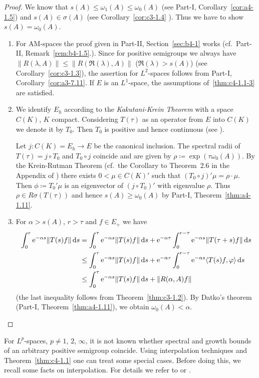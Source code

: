\begin{proof}
We know that $s(A) \leq \omega_{1}(A) \leq \omega_{0}(A)$ (see Part-I, Corollary~\ref{cor:a4-1.5}) and $s(A) \in \sigma(A)$ (see Corollary~\ref{cor:c3-1.4} ).
Thus we have to show $s(A) = \omega_{0}(A)$.
\begin{enumerate}[\upshape (i), wide, labelindent=.25em]
\item 
For AM-spaces the proof given in Part-II, Section~\ref{sec:b4-1} works (cf.\ Part-II, Remark~\ref{rem:b4-1.5}.).
Since for positive semigroups we always have $\|R(\lambda,A)\| \leq \|R(\Re(\lambda), A)\|$ ($\Re(\lambda) > s(A)$) (see   Corollary~\ref{cor:c3-1.3}), the assertion for $L^{2}$-spaces follows from Part-I, Corollary~\ref{cor:a3-7.11}.
If\/ $E$ is an $L^{1}$-space, the assumptions of~\ref{thm:c4-1.1-3} are satisfied.

\item 
We identify $E_{h}$ according to the \emph{Kakutani-Krein Theorem} with a space $C(K)$, $K$ compact.
Considering $T(\tau)$ as an operator from $E$ into $C(K)$ we denote it by $T_{0}$.
Then $T_{0}$ is positive and hence continuous (see \textcite[Theorem~5.3]{schaefer:1974}).

Let $j \colon C(K) = E_{h} \to E$ be the canonical inclusion.
The spectral radii of\/ $T(\tau) = j \circ T_{0}$ and $T_{0} \circ j$ coincide and are given by $\rho \coloneq  \exp(\tau \omega_{0}(A))$.
By the Krein-Rutman Theorem (cf.\ the Corollary to Theorem~2.6 in the Appendix of \textcite{schaefer:1966}) there exists $0 < \mu \in C(K)'$ such that $(T_{0} \circ j)'\mu = \rho \cdot \mu$.
Then $\phi \coloneq  T_{0}'\mu$ is an eigenvector of\/ $(j \circ T_{0})'$ with eigenvalue $\rho$.
Thus $\rho \in R\sigma(T(\tau))$ and hence $s(A) \geq \omega_{0}(A)$ by Part-I, Theorem~\ref{thm:a4-1.11}.

\item
For $\alpha > s(A)$, $r > \tau$ and $f \in E_{+}$ we have
\begin{align*}
\int_{0}^{r} \eu^{-\alpha s}\|T(s)f\| \ds &= \int_{0}^{\tau} \eu^{-\alpha s}\|T(s)f\| \ds + \eu^{-\alpha \tau}\int_{0}^{r-\tau} \eu^{-\alpha s}\|T(\tau+s)f\| \ds \\
&\leq \int_{0}^{\tau} \eu^{-\alpha s}\|T(s)f\| \ds + \eu^{-\alpha \tau}\int_{0}^{r-\tau} \eu^{-\alpha s}\langle T(s)f,\phi \rangle \ds \\
&\leq \int_{0}^{\tau} \eu^{-\alpha s}\|T(s)f\| \ds + \|R(\alpha,A)f\|
\end{align*}
(the last inequality follows from Theorem~\ref{thm:c3-1.2}).
By Datko's theorem (Part-I, Theorem~\ref{thm:a4-1.11}), we obtain $\omega_{0}(A) < \alpha$.
\qedhere
\end{enumerate}
\end{proof}
For $L^{p}$-spaces, $p \neq 1$, $2$, $\infty$, it is not known whether spectral and growth bounds of an arbitrary positive semigroup coincide.
Using interpolation techniques and  Theorem~\ref{thm:c4-1.1}  one can treat some special cases.
Before doing this, we recall some facts on interpolation.
For details we refer to 
\textcite[VI.10]{dunfordschwartz:1958} or \textcite[IX.4]{reedsimon:1975}.

